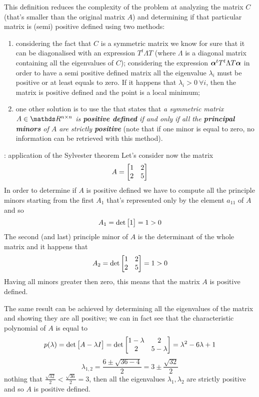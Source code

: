 		This definition reduces the complexity of the problem at analyzing the matrix $C$ (that's smaller than the original matrix $A$) and determining if that particular matrix is (semi) positive defined using two methods:
		\begin{enumerate}
			\item considering the fact that $C$ is a symmetric matrix we know for sure that it can be diagonalised with an expression $T^t \Lambda T$ (where $\Lambda$ is a diagonal matrix containing all the eigenvalues of $C$); considering the expression $\boldsymbol{\alpha}^t T^t \Lambda T \boldsymbol{\alpha}$ in order to have a semi positive defined matrix all the eigenvalue $\lambda_i$ must be positive or at least equals to zero. If it happens that $\lambda_i > 0 \ \forall i$, then the matrix is positive defined and the point is a local minimum;
			
			\item one other solution is to use the  that states that\textit{ a symmetric matrix $A\in \R^{n\times n}$ is \textbf{positive defined} if and only if all the \textbf{principal minors} of $A$ are strictly \textbf{positive}} (note that if one minor is equal to zero, no information can be retrieved with this method).
		\end{enumerate} 
		
		\begin{example}{: application of the Sylvester theorem}
			Let's consider now the matrix
			\[ A = \begin{bmatrix} 1 & 2 \\ 2 & 5 \end{bmatrix} \]
			In order to determine if $A$ is positive defined we have to compute all the principle minors starting from the first $A_1$ that's represented only by the element $a_{11}$ of $A$ and so
			\[ A_1 = \det \begin{bmatrix} 1 \end{bmatrix} = 1 > 0 \]
			The second (and last) principle minor of $A$ is the determinant of the whole matrix and it happens that
			\[ A_2 = \det \begin{bmatrix} 1 & 2 \\ 2 & 5 \end{bmatrix} = 1 > 0\]
			Having all minors greater then zero, this means that the matrix $A$ is positive defined. \vspace{3mm}
			
			The same result can be achieved by determining all the eigenvalues of the matrix and showing they are all positive; we can in fact see that the characteristic polynomial of $A$ is equal to
			\[ p(\lambda) = \det\big[A-\lambda I\big] = \det \begin{bmatrix} 1-\lambda & 2 \\ 2 & 5-\lambda \end{bmatrix} = \lambda^2 - 6\lambda + 1 \]		
			\[ \lambda_{1,2} = \frac{6\pm \sqrt{36-4}}{2} = 3 \pm \frac{\sqrt{32}}{2} \]
			nothing that $\frac{\sqrt{32}}{2} < \frac{\sqrt{36}}{2}	= 3$, then all the eigenvalues $\lambda_1,\lambda_2$ are strictly positive and so $A$ is positive defined.
		\end{example}
		
